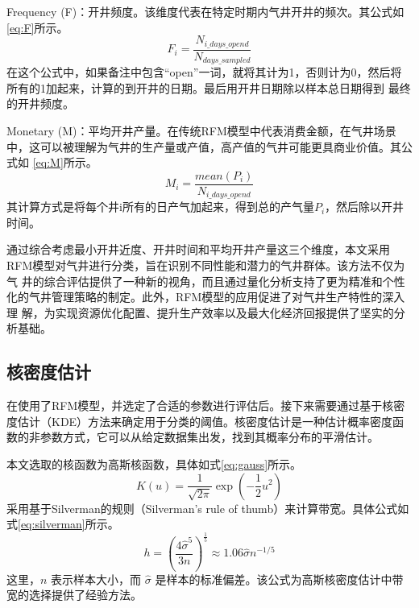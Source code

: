 Frequency (F)：开井频度。该维度代表在特定时期内气井开井的频次。其公式如\eqref{eq:F}所示。
\begin{equation}
    F_i=\frac{N_{i\_days\_opend}}{N_{days\_sampled}}
    \label{eq:F}
\end{equation}
在这个公式中，如果备注中包含“open”一词，就将其计为1，否则计为0，然后将所有的1加起来，计算的到开井的日期。最后用开井日期除以样本总日期得到
最终的开井频度。

Monetary (M)：平均开井产量。在传统RFM模型中代表消费金额，在气井场景中，这可以被理解为气井的生产量或产值，高产值的气井可能更具商业价值。其公式如
\eqref{eq:M}所示。
\begin{equation}
    M_i = \frac{mean(P_i)}{N_{i\_days\_opend}}
    \label{eq:M}
\end{equation}
其计算方式是将每个井i所有的日产气加起来，得到总的产气量$P_i$，然后除以开井时间。

通过综合考虑最小开井近度、开井时间和平均开井产量这三个维度，本文采用RFM模型对气井进行分类，旨在识别不同性能和潜力的气井群体。该方法不仅为气
井的综合评估提供了一种新的视角，而且通过量化分析支持了更为精准和个性化的气井管理策略的制定。此外，RFM模型的应用促进了对气井生产特性的深入理
解，为实现资源优化配置、提升生产效率以及最大化经济回报提供了坚实的分析基础。
\subsection{核密度估计}
在使用了RFM模型，并选定了合适的参数进行评估后。接下来需要通过基于核密度估计（KDE）方法来确定用于分类的阈值。核密度估计是一种估计概率密度函数的非参数方式，它可以从给定数据集出发，找到其概率分布的平滑估计。

本文选取的核函数为高斯核函数，具体如式\eqref{eq:gauss}所示。
\begin{equation}
    K(u) = \frac{1}{\sqrt{2\pi}} \exp\left(-\frac{1}{2} u^2\right)
    \label{eq:gauss}
\end{equation}
采用基于Silverman的规则（Silverman's rule of thumb）来计算带宽。具体公式如式\eqref{eq:silverman}所示。
\begin{equation}
    h = \left(\frac{4\hat{\sigma}^5}{3n}\right)^{\frac{1}{5}} \approx 1.06 \hat{\sigma} n^{-1/5}
    \label{eq:silverman}
\end{equation}
这里，\( n \) 表示样本大小，而 \( \hat{\sigma} \) 是样本的标准偏差。该公式为高斯核密度估计中带宽的选择提供了经验方法。

